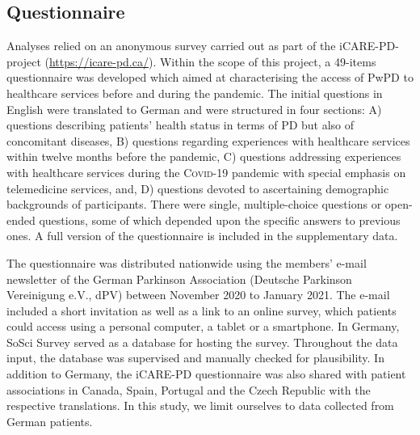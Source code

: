 \documentclass[a4paper,oneside,11pt,english]{scrartcl}
\begin{document}
\subsection*{Questionnaire}
Analyses relied on an anonymous survey carried out as part of the iCARE-\textsc{PD}-project (\url{https://icare-pd.ca/}). Within the scope of this project, a 49-items questionnaire was developed which aimed at characterising the access of Pw\textsc{PD} to healthcare services before and during the pandemic. The initial questions in English were translated to German and were structured in four sections: A) questions describing patients' health status in terms of \textsc{PD} but also of concomitant diseases, B) questions regarding experiences with healthcare services within twelve months before the pandemic, C) questions addressing experiences with healthcare services during the \textsc{Covid}-19 pandemic with special emphasis on telemedicine services, and, D) questions devoted to ascertaining demographic backgrounds of participants. There were single, multiple-choice questions or open-ended questions, some of which depended upon the specific answers to previous ones. A full version of the questionnaire is included in the supplementary data. 

The questionnaire was distributed nationwide using the members’ e-mail newsletter of the German Parkinson Association (Deutsche Parkinson Vereinigung e.V., dPV) between November 2020 to January 2021. The e-mail included a short invitation as well as a link to an online survey, which patients could access using a personal computer, a tablet or a smartphone. In Germany, SoSci Survey \cite{leiner2019sosci} served as a database for hosting the survey. Throughout the data input, the database was supervised and manually checked for plausibility. In addition to Germany, the iCARE-\textsc{PD} questionnaire was also shared with patient associations in Canada, Spain, Portugal and the Czech Republic with the respective translations. In this study, we limit ourselves to data collected from German patients. 
\end{document}
